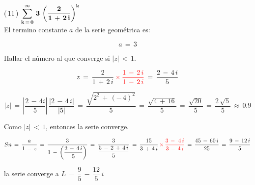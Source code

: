 \documentclass[a4paper,11pt,openany]{book}
\begin{document}
\textcolor{ao(english)}{(\,11\,)} $\bf{\displaystyle\sum\limits_{k\,=\,0}^{\infty}\,3\,\left(\dfrac{2}{1\,+\,2\,i}\right)^{k}}$\\

\textcolor{ao(english)}{} El termino constante $a$ de la serie geométrica es:

$$a\,=\,3$$

\textcolor{ao(english)}{} Hallar el número al que converge si $|z|\,<\,1$.

$$z\,=\,\dfrac{2}{1\,+\,2\,i}\,\textcolor{red}{\times\,\dfrac{1\,-\,2\,i}{1\,-\,2\,i}}\,=\,\dfrac{2\,-\,4\,i}{5}$$

$$|z|\,=\,\left|\dfrac{2\,-\,4i}{5}\right|\,\dfrac{|2\,-\,4\,i|}{|5|}\,=\,\dfrac{\sqrt{2^{2}\,+\,(-\,4)^{2}}}{5}\,=\,\dfrac{\sqrt{4\,+\,16}}{5}\,=\,\dfrac{\sqrt{20}}{5}\,=\,\dfrac{2\,\sqrt{5}}{5}\,\approx\,0.9$$

\textcolor{ao(english)}{} Como $|z|\,<\,1$, entonces la serie converge.

$$Sn\,=\,\dfrac{a}{1\,-\,z}\,=\,\dfrac{3}{1\,-\,\left(\dfrac{2\,-\,4\,i}{5}\right)}\,=\,\dfrac{3}{\dfrac{5\,-\,2\,+\,4\,i}{5}}\,=\,\dfrac{15}{3\,+\,4\,i}\,\textcolor{red}{\times\,\dfrac{3\,-\,\,4\,i}{3\,-\,4\,i}}\,=\,\dfrac{45\,-\,60\,i}{25}\,=\,\dfrac{9\,-\,12\,i}{5}$$

la serie converge a $L\,=\,\dfrac{9}{5}\,-\,\dfrac{12}{5}\,i$
\end{document}
